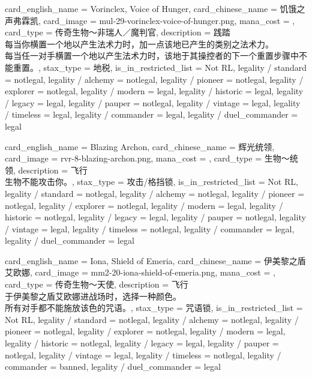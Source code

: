 \documentclass[lang = cn, color = black, 10pt]{AllThatStax}
\begin{document}
\card
{
	card_english_name = {Vorinclex, Voice of Hunger},
	card_chinese_name = {饥饿之声弗霖凯},
	card_image = mul-29-vorinclex-voice-of-hunger.png,
	mana_cost = ,
	card_type = 传奇生物～非瑞人／魔判官,
	description = {践踏\\
每当你横置一个地以产生法术力时，加一点该地已产生的类别之法术力。\\
每当任一对手横置一个地以产生法术力时，该地于其操控者的下一个重置步骤中不能重置。},
	stax_type = 地税,
	is_in_restricted_list = Not RL,
	legality / standard = notlegal,
	legality / alchemy = notlegal,
	legality / pioneer = notlegal,
	legality / explorer = notlegal,
	legality / modern = legal,
	legality / historic = legal,
	legality / legacy = legal,
	legality / pauper = notlegal,
	legality / vintage = legal,
	legality / timeless = legal,
	legality / commander = legal,
	legality / duel_commander = legal
}

\card
{
	card_english_name = {Blazing Archon},
	card_chinese_name = {辉光统领},
	card_image = rvr-8-blazing-archon.png,
	mana_cost = ,
	card_type = 生物～统领,
	description = {飞行\\
生物不能攻击你。},
	stax_type = 攻击/格挡锁,
	is_in_restricted_list = Not RL,
	legality / standard = notlegal,
	legality / alchemy = notlegal,
	legality / pioneer = notlegal,
	legality / explorer = notlegal,
	legality / modern = legal,
	legality / historic = notlegal,
	legality / legacy = legal,
	legality / pauper = notlegal,
	legality / vintage = legal,
	legality / timeless = notlegal,
	legality / commander = legal,
	legality / duel_commander = legal
}

\card
{
	card_english_name = {Iona, Shield of Emeria},
	card_chinese_name = {伊美黎之盾艾欧娜},
	card_image = mm2-20-iona-shield-of-emeria.png,
	mana_cost = ,
	card_type = 传奇生物～天使,
	description = {飞行\\
于伊美黎之盾艾欧娜进战场时，选择一种颜色。\\
所有对手都不能施放该色的咒语。},
	stax_type = 咒语锁,
	is_in_restricted_list = Not RL,
	legality / standard = notlegal,
	legality / alchemy = notlegal,
	legality / pioneer = notlegal,
	legality / explorer = notlegal,
	legality / modern = legal,
	legality / historic = notlegal,
	legality / legacy = legal,
	legality / pauper = notlegal,
	legality / vintage = legal,
	legality / timeless = notlegal,
	legality / commander = banned,
	legality / duel_commander = legal
}
\end{document}

